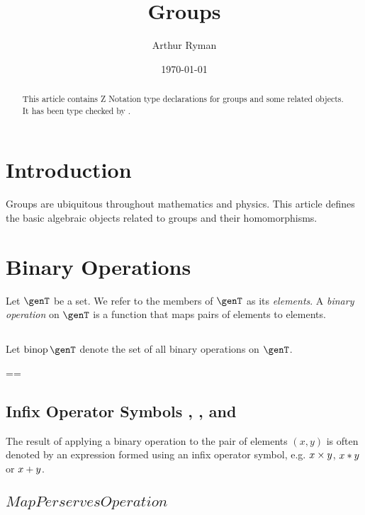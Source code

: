 \documentclass{amsart}
\begin{document}
\title{Groups}
\author{Arthur Ryman}
\date{\today}

\begin{abstract}
This article contains Z Notation type declarations for groups and some related objects.
It has been type checked by \fuzz.
\end{abstract}

\maketitle

\tableofcontents

\section{Introduction}

Groups are ubiquitous throughout mathematics and physics.
This article defines the basic algebraic objects related to groups and their homomorphisms.

\section{Binary Operations}

Let $\genT$ be a set. We refer to the members of $\genT$ as its {\em elements}.
A {\em binary operation} on $\genT$ is a function that maps pairs of elements to elements.

\subsection{}

Let $\binop \genT$ denote the set of all binary operations on $\genT$.

\begin{zed}
\binop \genT == \genT \cross \genT \fun \genT
\end{zed}

\subsection{Infix Operator Symbols , , and }

The result of applying a binary operation to the pair of elements $(x, y)$ 
is often denoted by an expression formed using an infix operator symbol,
e.g. $x \mathbin{\times} y$, $x \mathbin{*} y$ or $x \mathbin{+} y$.

\subsection{$MapPerservesOperation$}
\end{document}
